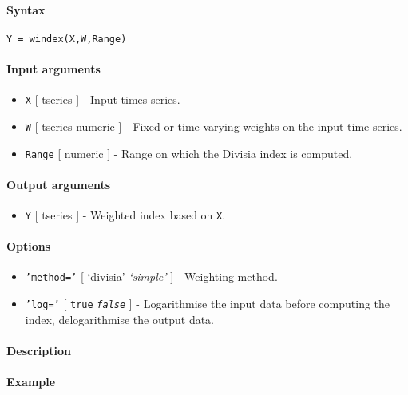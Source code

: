 


	\paragraph{Syntax}

\begin{verbatim}
Y = windex(X,W,Range)
\end{verbatim}

\paragraph{Input arguments}

\begin{itemize}
\item
  \texttt{X} {[} tseries {]} - Input times series.
\item
  \texttt{W} {[} tseries \textbar{} numeric {]} - Fixed or time-varying
  weights on the input time series.
\item
  \texttt{Range} {[} numeric {]} - Range on which the Divisia index is
  computed.
\end{itemize}

\paragraph{Output arguments}

\begin{itemize}
\itemsep1pt\parskip0pt
\item
  \texttt{Y} {[} tseries {]} - Weighted index based on \texttt{X}.
\end{itemize}

\paragraph{Options}

\begin{itemize}
\item
  \texttt{'method='} {[} `divisia' \textbar{} \emph{`simple'} {]} -
  Weighting method.
\item
  \texttt{'log='} {[} \texttt{true} \textbar{} \emph{\texttt{false}} {]}
  - Logarithmise the input data before computing the index,
  delogarithmise the output data.
\end{itemize}

\paragraph{Description}

\paragraph{Example}



